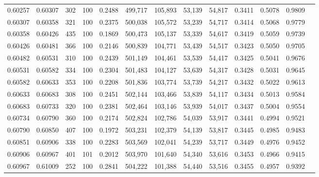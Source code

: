 \begin{tabular}{rrrrrrrrrrrrr}
0.60257 & 0.60307 &   302 & 100 &                                     0.2488 & 499,717 & 105,893 &  53,139 &  54,817 & 0.3411 & 0.5078 & 0.9809 \\
0.60307 & 0.60358 &   321 & 100 &                                     0.2375 & 500,038 & 105,572 &  53,239 &  54,717 & 0.3414 & 0.5068 & 0.9779 \\
0.60358 & 0.60426 &   435 & 100 &                                     0.1869 & 500,473 & 105,137 &  53,339 &  54,617 & 0.3419 & 0.5059 & 0.9739 \\
0.60426 & 0.60481 &   366 & 100 &                                     0.2146 & 500,839 & 104,771 &  53,439 &  54,517 & 0.3423 & 0.5050 & 0.9705 \\
0.60482 & 0.60531 &   310 & 100 &                                     0.2439 & 501,149 & 104,461 &  53,539 &  54,417 & 0.3425 & 0.5041 & 0.9676 \\
0.60531 & 0.60582 &   334 & 100 &                                     0.2304 & 501,483 & 104,127 &  53,639 &  54,317 & 0.3428 & 0.5031 & 0.9645 \\
0.60582 & 0.60633 &   353 & 100 &                                     0.2208 & 501,836 & 103,774 &  53,739 &  54,217 & 0.3432 & 0.5022 & 0.9613 \\
0.60633 & 0.60683 &   308 & 100 &                                     0.2451 & 502,144 & 103,466 &  53,839 &  54,117 & 0.3434 & 0.5013 & 0.9584 \\
0.60683 & 0.60733 &   320 & 100 &                                     0.2381 & 502,464 & 103,146 &  53,939 &  54,017 & 0.3437 & 0.5004 & 0.9554 \\
0.60734 & 0.60790 &   360 & 100 &                                     0.2174 & 502,824 & 102,786 &  54,039 &  53,917 & 0.3441 & 0.4994 & 0.9521 \\
0.60790 & 0.60850 &   407 & 100 &                                     0.1972 & 503,231 & 102,379 &  54,139 &  53,817 & 0.3445 & 0.4985 & 0.9483 \\
0.60851 & 0.60906 &   338 & 100 &                                     0.2283 & 503,569 & 102,041 &  54,239 &  53,717 & 0.3449 & 0.4976 & 0.9452 \\
0.60906 & 0.60967 &   401 & 101 &                                     0.2012 & 503,970 & 101,640 &  54,340 &  53,616 & 0.3453 & 0.4966 & 0.9415 \\
0.60967 & 0.61009 &   252 & 100 &                                     0.2841 & 504,222 & 101,388 &  54,440 &  53,516 & 0.3455 & 0.4957 & 0.9392 \\

\end{tabular}
